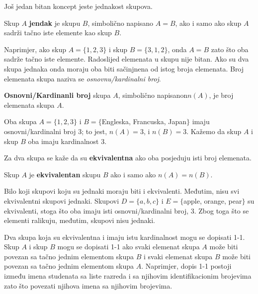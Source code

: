 \documentclass[a4paper, 14pt]{article}
\begin{document}
Još jedan bitan koncept jeste jednakost skupova.\smallskip
\begin{tcolorbox}
Skup $A$ \textbf{jendak} je skupu $B$, simbolično napisano $A=B$, ako i samo ako skup $A$ sadrži tačno iste elemente kao skup $B$.
\end{tcolorbox}\smallskip
\noindent Naprimjer, ako skup $A=\{1, 2, 3\}$ i skup $B=\{3, 1, 2\}$, onda $A=B$ zato što oba sadrže tačno iste elemente. Radoslijed elemenata u skupu nije bitan. Ako su dva skupa jednaka onda moraju oba biti sačinjnena od istog broja elemenata. Broj elemenata skupa naziva se \textit{osnovnu/kardinalni broj}.\smallskip
\begin{tcolorbox}
\textbf{Osnovni/Kardinanli broj} skupa $A$, simbolično napisanon$n(A)$, je broj elemenata skupa $A$.
\end{tcolorbox}\smallskip
Oba skupa $A=\{1, 2, 3\}$ i $B=\{$Engleska, Francuska, Japan$\}$ imaju osnovni/kardinalni broj 3; to jest, $n(A)=3$, i $n(B)=3$. Kažemo da skup $A$ i skup $B$ oba imaju kardinalnost 3.\par
Za dva skupa se kaže da su \textbf{ekvivalentna} ako oba posjeduju isti broj elemenata.\smallskip
\begin{tcolorbox}
Skup $A$ je \textbf{ekvivalentan} skupu $B$ ako i samo ako $n(A)=n(B)$.
\end{tcolorbox}\smallskip
\noindent Bilo koji skupovi koju su jednaki moraju biti i ekvivalenti. Međutim, nisu svi ekvivalentni skupovi jednaki. Skupovi $D=\{a, b, c\}$ i $E=\{$apple, orange, pear$\}$ su ekvivalenti, stoga što oba imaju isti osnovni/kardinalni broj, 3. Zbog toga što se elementi ralikuju, međutim, skupovi nisu jednaki.\par
Dva skupa koja su ekvivalentna i  imaju istu kardinalnost mogu se dopisati 1-1. Skup $A$ i skup $B$ mogu se dopisati 1-1 ako svaki elemenat skupa $A$ može biti povezan sa tačno jednim elementom skupa $B$ i svaki elemenat skupa $B$ može biti povezan sa tačno jednim elementom skupa $A$. Naprimjer, dopis 1-1 postoji između imena studenata sa liste razreda i sa njihovim identifikacionim brojevima zato što povezati njihova imena sa njihovim brojevima.\smallskip
\end{document}
